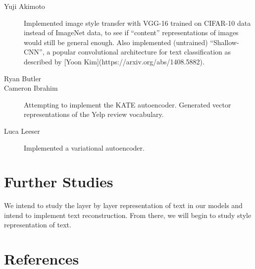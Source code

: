 \documentclass{article}
\begin{document}
\begin{description}

	\item [Yuji Akimoto]
		Implemented image style transfer with VGG-16 trained on CIFAR-10 data instead of ImageNet data, to see if ``content'' representations of images would still be general enough. Also implemented (untrained) ``Shallow-CNN'', a popular convolutional architecture for text classification as described by [Yoon Kim](https://arxiv.org/abs/1408.5882).

	\item [Ryan Butler]

	\item [Cameron Ibrahim]
		Attempting to implement the KATE autoencoder.
		Generated vector representations of the Yelp review vocabulary. 

	\item [Luca Leeser]
		Implemented a variational autoencoder.

\end{description}

\section{Further Studies}

We intend to study the layer by layer representation of text in our models and intend to implement text reconstruction. From there, we will begin to study style representation of text.

\section{References}
\end{document}
